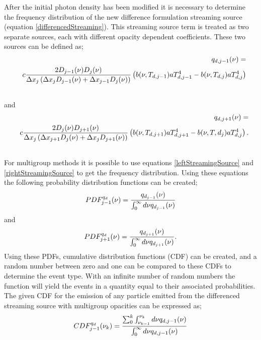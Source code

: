 	After the initial photon density has been modified it is necessary to determine the frequency distribution of the new difference formulation streaming source (equation \ref{differencedStreaming}). This streaming source term is treated as two separate sources, each with different opacity dependent coefficients. These two sources can be defined as;
	\begin{eqnarray}
	 \label{leftStreamingSource}
	&&q_{d,{j-1}}(\nu)=\nonumber \\&& c{2D_{j-1}(\nu)D_{j}(\nu)\over{\Delta{x_j}\left(\Delta{x_{j}}D_{j-1}(\nu)+\Delta{x_{j-1}}D_{j}(\nu)\right)}}\left(b(\nu,T_{d,{j-1}})aT_{d,{j-1}}^4-b(\nu,T_{d,{j}})aT_{d,{j}}^4\right)\nonumber \\& &
	\end{eqnarray}
	and
	\begin{eqnarray}
	 \label{rightStreamingSource}
	&&q_{d,{j+1}}(\nu)=\nonumber \\&& c{2D_j(\nu)D_{j+1}(\nu)\over{\Delta{x_j}\left(\Delta{x_{j+1}}D_j(\nu)+\Delta{x_{j}}D_{j+1}(\nu)\right)}}\left(b(\nu,T_{d,{j+1}})aT_{d,{j+1}}^4-b(\nu,T,{d_{j}})aT_{d,{j}}^4\right)\nonumber. \\& &
	\end{eqnarray}
	For multigroup methods it is possible to use equations \ref{leftStreamingSource} and \ref{rightStreamingSource} to get the frequency distribution. Using these equations the following probability distribution functions can be created;
	\begin{equation}
	\label{PDF_q_d_j-1}
	PDF^{q_d}_{j-1}(\nu)={q_{d_{j-1}}(\nu)\over{\int^\infty_0d\nu q_{d_{j-1}}(\nu)}}
	\end{equation}
	and
	\begin{equation}
	\label{PDF_q_d_j+1}
	PDF^{q_d}_{j+1}(\nu)={q_{d_{j+1}}(\nu)\over{\int^\infty_0d\nu q_{d_{j+1}}(\nu)}}.
	\end{equation}
	Using these PDFs, cumulative distribution functions (CDF) can be created, and a random number between zero and one can be compared to these CDFs to determine the event type. With an infinite number of random numbers the function will yield the events in a quantity equal to their associated probabilities. The given CDF for the emission of any particle emitted from the differenced streaming source with multigroup opacities can be expressed as;
	\begin{equation}
	\label{CDF_q_d_j-1}
	CDF^{q_d}_{j-1}(\nu_k)={\sum_0^k\int^{\nu_k}_{\nu_{k-1}}d\nu q_{d,{j-1}}(\nu)\over{\int^\infty_0d\nu q_{d,{j-1}}(\nu)}}
	\end{equation}
